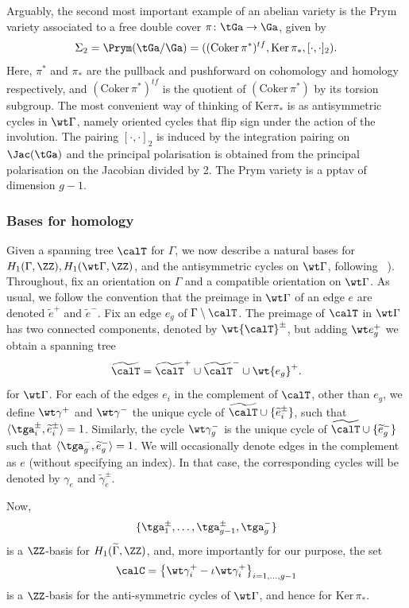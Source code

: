Arguably, the second most important example of an abelian variety is the  Prym variety  associated to a free double cover $\pi\colon \tGa \to \Ga$,  given by
\[ 
\Sigma_2=\Prym(\tGa/\Ga)=((\text{Coker}\,\pi^*)^{tf},\mathrm{Ker}\,\pi_*,[\cdot,\cdot]_2).
\]
Here, $\pi^*$ and $\pi_*$ are the pullback and pushforward on cohomology and homology respectively, and $(\text{Coker}\,\pi^*)^{tf}$ is the quotient of $(\text{Coker}\,\pi^*)$ by its torsion subgroup. The most convenient way of thinking of $\mathrm{Ker}\pi_*$ is as antisymmetric cycles in $\wt\Gamma$, namely oriented cycles that flip sign under the action of the involution. The pairing $[\cdot,\cdot]_2$ is induced by the integration pairing on $\Jac(\tGa)$ and the principal polarisation is obtained from the principal polarisation on the Jacobian  divided by 2. The Prym variety is a pptav of dimension $g-1$. 


\subsubsection{Bases for homology}
Given a spanning tree $\calT$ for $\Gamma$, we now describe a
natural bases for $H_1(\Gamma,\ZZ), H_1(\wt\Gamma,\ZZ)$, and the antisymmetric cycles on $\wt\Gamma$, following ~\cite[Construction B]{LZ22}). Throughout, fix an orientation on $\Gamma$ and a compatible orientation on $\wt\Gamma$.
As usual, we follow the convention that the preimage in $\wt\Gamma$ of an edge $e$ are denoted $\tilde e^+$ and $\tilde e^-$. 
Fix an edge $e_g$   of $\Gamma\setminus \calT$.  
 The preimage of $\calT$ in $\wt\Gamma$ has two connected components, denoted by 
$\wt{\calT}^{\pm}$, but adding $\wt e_g^+$ we obtain a spanning tree
\[
\widetilde{\calT}=\widetilde{\calT}^{+}\cup\widetilde{\calT}^{-}\cup \wt{e_g}^+.
\]
for $\wt\Gamma$.
For each of the edges $e_i$ in the complement of $\calT$, other than $e_g$, we define $\wt\gamma^+$ and $\wt\gamma^-$  the unique cycle 
of $\widetilde{\calT}\cup \{\widetilde{e}_{i}^{\pm}\}$, such that $\langle\tga_{i}^{\pm},\widetilde{e}_{i}^{\pm}\rangle=1$. Similarly, the cycle $\wt\gamma_g^-$ is the unique cycle of $\widetilde{\calT}\cup \{\widetilde{e}_{g}^{-}\}$ such that $\langle\tga_{g}^{-},\widetilde{e}_{g}^{-}\rangle=1$.   We will occasionally denote edges in the complement as $e$ (without specifying an index). In that  case, the corresponding cycles will be denoted by $\gamma_e$ and $\tilde\gamma_e^{\pm}$.


Now,
\begin{equation*}
    \{\tga^{\pm}_{1},\dots, \tga^{\pm}_{g-1}, \tga_g^-\}
\end{equation*}
is a $\ZZ$-basis for $H_1(\widetilde{\Gamma},\ZZ)$, and, more importantly for our purpose,  the set
\[
\calC = \left\{\wt\gamma_i^+ - \iota\wt\gamma_i^+\right\}_{i=1,\ldots,g-1}
\]
is a $\ZZ$-basis for the anti-symmetric cycles of $\wt\Gamma$, and hence for $\mathrm{Ker}\,\pi_*$. 

